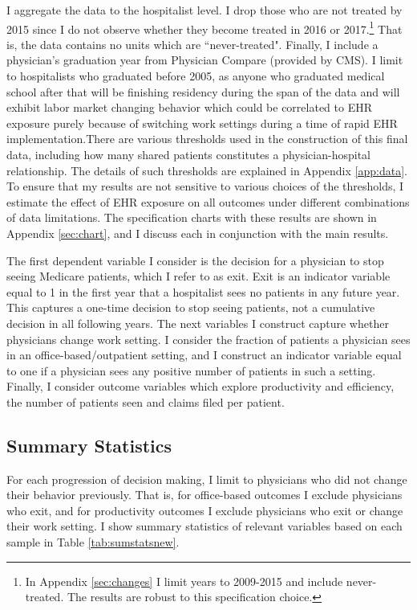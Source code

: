 \documentclass[12pt]{article}
\begin{document}
I aggregate the data to the hospitalist level. I drop those who are not treated by 2015 since I do not observe whether they become treated in 2016 or 2017.\footnote{In Appendix \ref{sec:changes} I limit years to 2009-2015 and include never-treated. The results are robust to this specification choice.} That is, the data contains no units which are ``never-treated". Finally, I include a physician's graduation year from Physician Compare (provided by CMS). I limit to hospitalists who graduated before 2005, as anyone who graduated medical school after that will be finishing residency during the span of the data and will exhibit labor market changing behavior which could be correlated to EHR exposure purely because of switching work settings during a time of rapid EHR implementation.There are various thresholds used in the construction of this final data, including how many shared patients constitutes a physician-hospital relationship. The details of such thresholds are explained in Appendix \ref{app:data}. To ensure that my results  are not sensitive to various choices of the thresholds, I estimate the effect of EHR exposure on all outcomes under different combinations of data limitations. The specification charts with these results are shown in Appendix \ref{sec:chart}, and I discuss each in conjunction with the main results. 

The first dependent variable I consider is the decision for a physician to stop seeing Medicare patients, which I refer to as exit. Exit is an indicator variable equal to 1 in the first year that a hospitalist sees no patients in any future year. This captures a one-time decision to stop seeing patients, not a cumulative decision in all following years. The next variables I construct capture whether physicians change work setting. I consider the fraction of patients a physician sees in an office-based/outpatient setting, and I construct an indicator variable equal to one if a physician sees any positive number of patients in such a setting. Finally, I consider outcome variables which explore productivity and efficiency, the number of patients seen and claims filed per patient.


\subsection{Summary Statistics}

For each progression of decision making, I limit to physicians who did not change their behavior previously. That is, for office-based outcomes I exclude physicians who exit, and for productivity outcomes I exclude physicians who exit or change their work setting. I show summary statistics of relevant variables based on each sample in Table \ref{tab:sumstatsnew}. 
\end{document}
